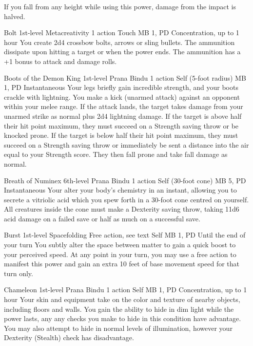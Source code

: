 If you fall from any height while using this power,
damage from the impact is halved.

\DndPowerHeader%
  {Bolt}
  {1st-level Metacreativity}
  {1 action}
  {Touch}
  {MB 1, PD \lvlone}
  {Concentration, up to 1 hour}
You create 2d4 crossbow bolts, arrows or sling bullets.
The ammunition dissipate upon hitting a target
or when the power ends.
The ammunition has a +1 bonus to attack and damage rolls.

\DndPowerHeader%
  {Boots of the Demon King}
  {1st-level Prana Bindu}
  {1 action}
  {Self (5-foot radius)}
  {MB 1, PD \lvlone}
  {Instantaneous}
Your legs briefly gain incredible strength,
and your boots crackle with lightning.
You make a kick (unarmed attack) against an
opponent within your melee range.
If the attack lands,
the target takes damage from your unarmed strike
as normal plus 2d4 lightning damage.
If the target is above half their hit point maximum,
they must succeed on a Strength saving throw or be knocked prone.
If the target is below half their hit point maximum,
they must succeed on a Strength saving throw or immediately
be sent a distance into the air equal to your Strength score.
They then fall prone and take fall damage as normal.

\DndPowerHeader%
  {Breath of Numinex}
  {6th-level Prana Bindu}
  {1 action}
  {Self (30-foot cone)}
  {MB 5, PD \lvlsix}
  {Instantaneous}
Your alter your body's chemistry in an instant,
allowing you to secrete a vitriolic acid
which you spew forth in a 30-foot cone
centred on yourself.
All creatures inside the cone must make a
Dexterity saving throw,
taking 11d6 acid damage on a failed save
or half as much on a successful save. 

\DndPowerHeader%
  {Burst}
  {1st-level Spacefolding}
  {Free action, see text}
  {Self}
  {MB 1, PD \lvlone}
  {Until the end of your turn}
You subtly alter the space between matter
to gain a quick boost to your perceived speed.
At any point in your turn,
you may use a free action to manifest this power
and gain an extra 10 feet of base movement speed
for that turn only.

\DndPowerHeader%
  {Chameleon}
  {1st-level Prana Bindu}
  {1 action}
  {Self}
  {MB 1, PD \lvlone}
  {Concentration, up to 1 hour}
  Your skin and equipment take on the color and texture
  of nearby objects,
  including floors and walls.
  You gain the ability to hide in dim light
  while the power lasts,
  any any checks you make to hide in this
  condition have advantage.
  You may also attempt to hide in normal levels
  of illumination,
  however your Dexterity (Stealth) check has disadvantage.

